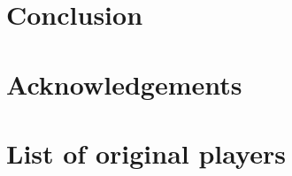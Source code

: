 \documentclass{article}
\begin{document}
\section{Conclusion}\label{sec:conclusion}

\section*{Acknowledgements}





\appendix

\section{List of original players}\label{app:list_of_original_players}


\begin{multicols}{2}
    \begin{enumerate}
            
    \end{enumerate}
\end{multicols}
\end{document}
